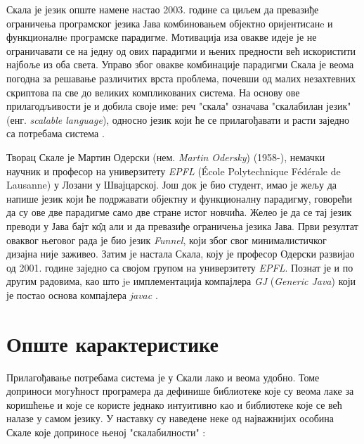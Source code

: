 \documentclass[12pt,oneside]{memoir}
\begin{document}
Скала је језик опште намене настао 2003. године са циљем да превазиђе ограничења програмског језика Јава комбиновањем објектно оријентисанe и функционалнe програмске парадигме. Мотивација иза овакве идеје је не ограничавати се на једну од ових парадигми и њених предности већ искористити најбоље из оба света. Управо због овакве комбинације парадигми Скала је веома погодна за решавање различитих врста проблема, почевши од малих незахтевних скриптова па све до великих компликованих система. На основу ове прилагодљивости је и добила своје име: реч "скала" означава "скалабилан језик" (енг. \textit{scalable language}), односно језик који ће се прилагођавати и расти заједно са потребама система \cite{progInScala}.
\par Творац Скале је Мартин Одерски (нем. \textit{Martin Odersky}) (1958-), немачки научник и професор на универзитету \textit{EPFL} (École Polytechnique Fédérale de Lausanne) у Лозани у Швајцарској. Још док је био студент, имао је жељу да напише језик који ће подржавати објектну и функционалну парадигму, говорећи да су ове две парадигме само две стране истог новчића. Желео је да се тај језик преводи у Јава бајт к\^{о}д али и да превазиђе ограничења језика Јава. Први резултат оваквог његовог рада је био језик \textit{Funnel}, који због свог минималистичког дизајна није заживео. Затим је настала Скала, коју је професор Одерски развијао од 2001. године заједно са својом групом на универзитету \textit{EPFL}. Познат је и по другим радовима, као што je имплементација компајлера \textit{GJ} (\textit{Generic Java}) који је постао основа компајлера \textit{javac} \cite{MartinEpfl, ScalaHistory}.

\section{Опште карактеристике}
\label{sec:opsteKarakt}

Прилагођавање потребама система је у Скали лако и веома удобно. Томе доприноси могућност програмера да дефинише библиотеке које су веома лаке за коришћење и које се користе једнако интуитивно као и библиотеке које се већ налазе у самом језику. У наставку су наведене неке од најважнијих особина Скале које доприносе њеној "скалабилности" \cite{progInScala}:
\end{document}
